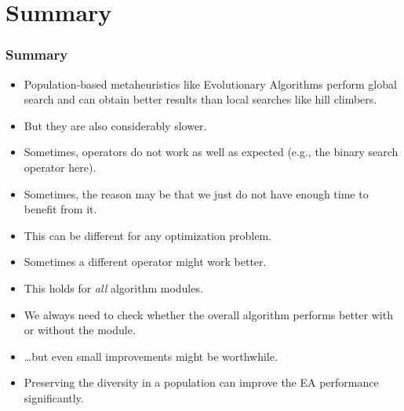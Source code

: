 \documentclass[mathserif]{beamer}%
\begin{document}
\section{Summary}%
%
\begin{frame}%
\frametitle{Summary}%
\begin{itemize}%
\item Population-based metaheuristics like Evolutionary Algorithms perform global search and can obtain better results than local searches like hill climbers.%
\item<2-> But they are also considerably slower.%
\item<3-> Sometimes, operators do not work as well as expected (e.g., the binary search operator here).%
\item<4-> Sometimes, the reason may be that we just do not have enough time to benefit from it.%
\item<5-> This can be different for any optimization problem.%
\item<6-> Sometimes a different operator might work better.%
\item<7-> This holds for \emph{all} algorithm modules.%
\item<8-> We always need to check whether the overall algorithm performs better with or without the module.%
\item<9-> {\dots}but even small improvements might be worthwhile.%
\item<10-> Preserving the diversity in a population can improve the EA performance significantly.%
\end{itemize}%
%
%
\end{frame}%
%
\endPresentation%
\end{document}
